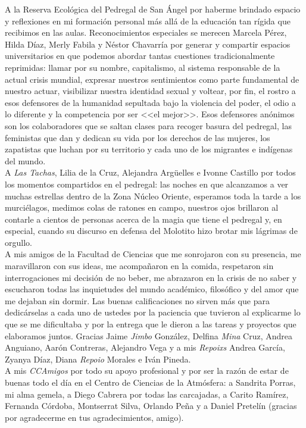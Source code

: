A la Reserva Ecológica del Pedregal de San Ángel por haberme brindado espacio y reflexiones en mi formación personal más allá de la educación tan rígida que recibimos en las aulas. Reconocimientos especiales se merecen Marcela Pérez, Hilda Díaz, Merly Fabila y Néstor Chavarría por generar y compartir espacios universitarios en que podemos abordar tantas cuestiones tradicionalmente reprimidas: llamar por su nombre, capitalismo, al sistema responsable de la actual crisis mundial, expresar nuestros sentimientos como parte fundamental de nuestro actuar, visibilizar nuestra identidad sexual y voltear, por fin, el rostro a esos defensores de la humanidad sepultada bajo la violencia del poder, el odio a lo diferente y la competencia por ser <<el mejor>>. Esos defensores anónimos son los colaboradores que se saltan clases para recoger basura del pedregal, las feministas que dan y dedican su vida por los derechos de las mujeres, los zapatistas que luchan por su territorio y cada uno de los migrantes e indígenas del mundo.\\

A \textit{Las Tachas}, Lilia de la Cruz, Alejandra Argüelles e Ivonne Castillo por todos los momentos compartidos en el pedregal: las noches en que alcanzamos a ver muchas estrellas dentro de la Zona Núcleo Oriente, esperamos toda la tarde a los murciélagos, medimos colas de ratones en campo, nuestros ojos brillaron al contarle a cientos de personas acerca de la magia que tiene el pedregal y, en especial, cuando su discurso en defensa del Molotito hizo brotar mis lágrimas de orgullo.\\  

A mis amigos de la Facultad de Ciencias que me sonrojaron con su presencia, me maravillaron con sus ideas, me acompañaron en la comida, respetaron sin interrogaciones mi decisión de no beber, me abrazaron en la crisis de no saber y escucharon todas las inquietudes del mundo académico, filosófico y del amor que me dejaban sin dormir. Las buenas calificaciones no sirven más que para dedicárselas a cada uno de ustedes por la paciencia que tuvieron al explicarme lo que se me dificultaba y por la entrega que le dieron a las tareas y proyectos que elaboramos juntos. Gracias Jaime \textit{Jimbo} González, Delfina \textit{Mina} Cruz, Andrea Anguiano, Aarón Contreras, Alejandro Vega y a mis \textit{Repoixs} Andrea García, Zyanya Díaz, Diana \textit{Repoio} Morales e Iván Pineda.\\

A mis \textit{CCAmigos} por todo su apoyo profesional y por ser la razón de estar de buenas todo el día en el Centro de Ciencias de la Atmósfera: a Sandrita Porras, mi alma gemela, a Diego Cabrera por todas las carcajadas, a Carito Ramírez, Fernanda Córdoba, Montserrat Silva, Orlando Peña y a Daniel Pretelín (gracias por agradecerme en tus agradecimientos, amigo).\\

